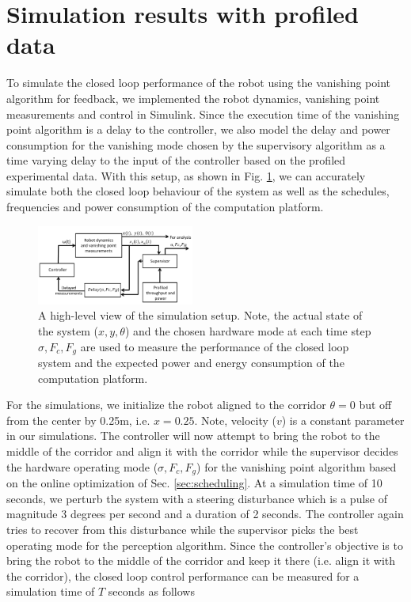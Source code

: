 \section{Simulation results with profiled data}
\label{sec:simResults}

To simulate the closed loop performance of the robot using the vanishing point algorithm for feedback, we implemented the robot dynamics, vanishing point measurements and control in Simulink. Since the execution time of the vanishing point algorithm is a delay to the controller, we also model the delay and power consumption for the vanishing mode chosen by the supervisory algorithm as a time varying delay to the input of the controller based on the profiled experimental data. With this setup, as shown in Fig. \ref{fig:simSetup}, we can accurately simulate both the closed loop behaviour of the system as well as the schedules, frequencies and power consumption of the computation platform.



\begin{figure}[hbtp]
\centering
\includegraphics[width=0.46\textwidth]{Figs/SimulationSetup_scissored.pdf}
\caption{A high-level view of the simulation setup. Note, the actual state of the system ($x,y,\theta$) and the chosen hardware mode at each time step $\sigma,F_c,F_g$ are used to measure the performance of the closed loop system and the expected power and energy consumption of the computation platform.}
\label{fig:simSetup} %
\end{figure}

For the simulations, we initialize the robot aligned to the corridor $\theta=0$ but off from the center by 0.25m, i.e. $x=0.25$. Note, velocity ($v$) is a constant parameter in our simulations. The controller will now attempt to bring the robot to the middle of the corridor and align it with the corridor while the supervisor decides the hardware operating mode ($\sigma,F_c,F_g$) for the vanishing point algorithm based on the online optimization of Sec. \ref{sec:scheduling}. At a simulation time of 10 seconds, we perturb the system with a steering disturbance which is a pulse of magnitude 3 degrees per second and a duration of 2 seconds. The controller again tries to recover from this disturbance while the supervisor picks the best operating mode for the perception algorithm. Since the controller's objective is to bring the robot to the middle of the corridor and keep it there (i.e. align it with the corridor), the closed loop control performance can be measured for a simulation time of $T$ seconds as follows

